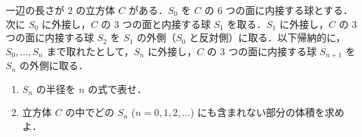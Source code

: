 一辺の長さが $2$ の立方体 $C$ がある．$S_0$ を $C$ の $6$ つの面に内接する球とする．次に $S_0$ に外接し，$C$ の $3$ つの面と内接する球 $S_1$ を取る．$S_1$ に外接し，$C$ の $3$ つの面に内接する球 $S_2$ を $S_1$ の外側（$S_0$ と反対側）に取る．以下帰納的に，$S_0, \ldots, S_n$ まで取れたとして，$S_n$ に外接し，$C$ の $3$ つの面に内接する球 $S_{n+1}$ を $S_n$ の外側に取る．
\begin{enumerate}
  \item $S_n$ の半径を $n$ の式で表せ．
  \item 立方体 $C$ の中でどの $S_n$ ($n=0,1,2,\ldots$) にも含まれない部分の体積を求めよ．
\end{enumerate}

